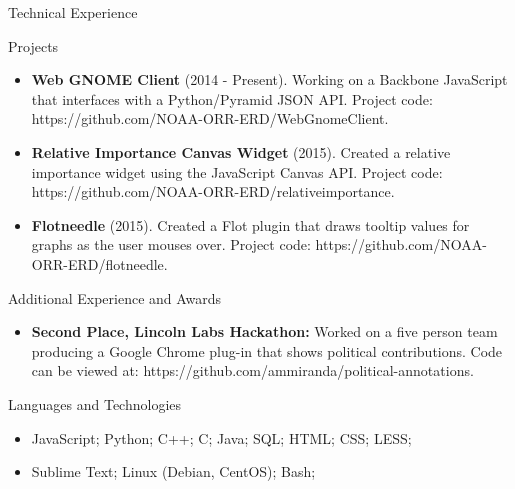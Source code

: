 \documentclass[]{mcdowellcv}
\begin{document}
	\begin{cvsection}{Technical Experience}
		\begin{cvsubsection}{Projects}{}{}
			\begin{itemize}
        \item \textbf{Web GNOME Client} (2014 - Present). Working on a Backbone JavaScript that interfaces with a Python/Pyramid JSON API. Project code: https://github.com/NOAA-ORR-ERD/WebGnomeClient. 
				\item \textbf{Relative Importance Canvas Widget} (2015). Created a relative importance widget using the JavaScript Canvas API. Project code: https://github.com/NOAA-ORR-ERD/relativeimportance.
        \item \textbf{Flotneedle} (2015). Created a Flot plugin that draws tooltip values for graphs as the user mouses over. Project code: https://github.com/NOAA-ORR-ERD/flotneedle.
			\end{itemize}
		\end{cvsubsection}
	\end{cvsection}
	
	\begin{cvsection}{Additional Experience and Awards}
		\begin{cvsubsection}{}{}{}	
			\begin{itemize}
				\item \textbf{Second Place, Lincoln Labs Hackathon:} Worked on a five person team producing a Google Chrome plug-in that shows political contributions. Code can be viewed at: https://github.com/ammiranda/political-annotations.
			\end{itemize}
		\end{cvsubsection}
	\end{cvsection}
	
	\begin{cvsection}{Languages and Technologies}
		\begin{cvsubsection}{}{}{}	
			\begin{itemize}
				\item JavaScript; Python; C++; C; Java; SQL; HTML; CSS; LESS; 
        \item Sublime Text; Linux (Debian, CentOS); Bash;
			\end{itemize}
		\end{cvsubsection}
	\end{cvsection}
	
\end{document}
